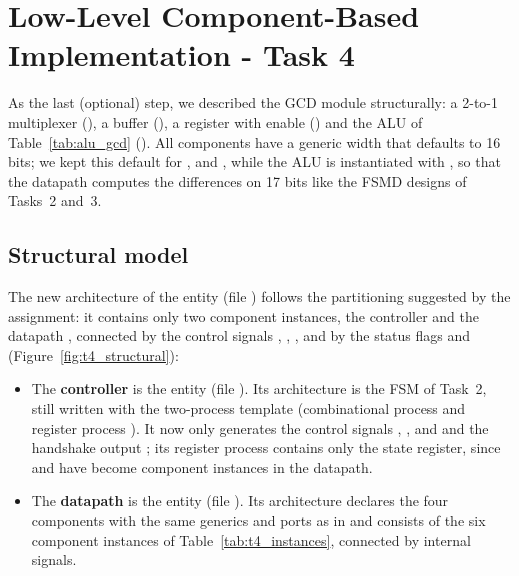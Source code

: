 \section{Low-Level Component-Based Implementation - Task 4}

As the last (optional) step, we described the GCD module structurally: a 2-to-1 multiplexer (), a buffer (), a register with enable () and the ALU of Table~\ref{tab:alu_gcd} (). All components have a generic width that defaults to 16 bits; we kept this default for ,  and , while the ALU is instantiated with , so that the datapath computes the differences on 17 bits like the FSMD designs of Tasks~2 and~3.

\subsection{Structural model}

The new architecture  of the entity  (file ) follows the partitioning suggested by the assignment: it contains only two component instances, the controller  and the datapath , connected by the control signals , , ,  and by the status flags  and  (Figure~\ref{fig:t4_structural}):
\begin{itemize}
    \item The \textbf{controller} is the entity  (file ). Its architecture  is the FSM of Task~2, still written with the two-process template (combinational process  and register process ). It now only generates the control signals , ,  and  and the handshake output ; its register process contains only the state register, since  and  have become component instances in the datapath.
    \item The \textbf{datapath} is the entity  (file ). Its architecture  declares the four components with the same generics and ports as in  and consists of the six component instances of Table~\ref{tab:t4_instances}, connected by internal signals.
\end{itemize}

